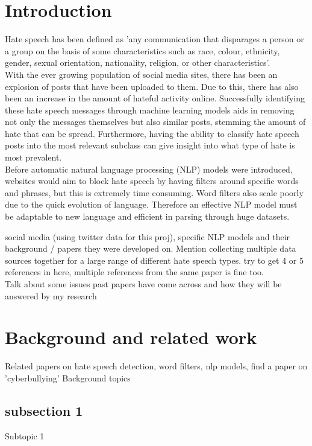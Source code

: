 \documentclass[conference]{IEEEtran}
\begin{document}
\section{Introduction}
Hate speech has been defined as 'any communication that disparages a person or a group on the basis of some characteristics such as race, colour, ethnicity, gender, sexual orientation, nationality, religion, or other characteristics'. \cite{b1} \\
With the ever growing population of social media sites, there has been an explosion of posts that have been uploaded to them. Due to this, there has also been an increase in the amount of hateful activity online. Successfully identifying these hate speech messages through machine learning models aids in removing not only the messages themselves but also similar posts, stemming the amount of hate that can be spread. Furthermore, having the ability to classify hate speech posts into the most relevant subclass can give insight into what type of hate is most prevalent.\\
Before automatic natural language processing (NLP) models were introduced, websites would aim to block hate speech by having filters around specific words and phrases, but this is extremely time consuming. Word filters also scale poorly due to the quick evolution of language. \cite{b2, b3} Therefore an effective NLP model must be adaptable to new language and efficient in parsing through huge datasets.

\pagebreak
social media (using twitter data for this proj), specific NLP models and their background / papers they were developed on. Mention collecting multiple data sources together for a large range of different hate speech types. try to get 4 or 5 references in here, multiple references from the same paper is fine too.\\ Talk about some issues past papers have come across and how they will be answered by my research

\section{Background and related work}
Related papers on hate speech detection, word filters, nlp models, find a paper on 'cyberbullying'
Background topics

\subsection{subsection 1}
Subtopic 1
\end{document}
